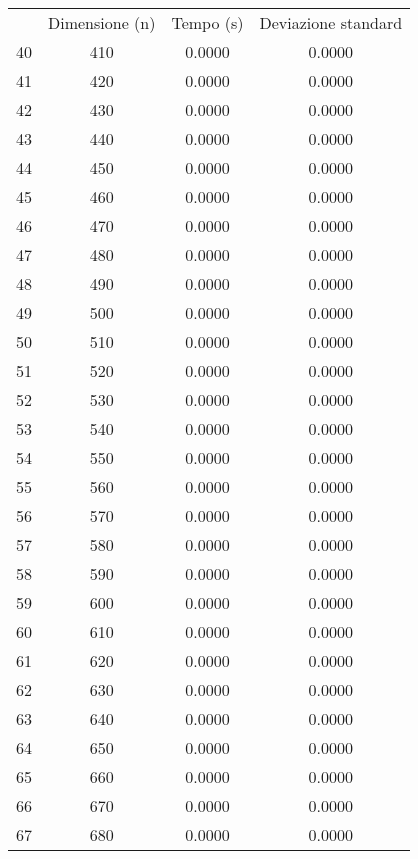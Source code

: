 \begin{table}
\centering
\begin{adjustbox}{width=1\textwidth/2}
\begin{tabular}{|c|c|c|c|}
\hline
 & Dimensione (n) & Tempo (s) & Deviazione standard \\
40 & 410 & 0.0000 & 0.0000 \\
\cline{1-4}
41 & 420 & 0.0000 & 0.0000 \\
\cline{1-4}
42 & 430 & 0.0000 & 0.0000 \\
\cline{1-4}
43 & 440 & 0.0000 & 0.0000 \\
\cline{1-4}
44 & 450 & 0.0000 & 0.0000 \\
\cline{1-4}
45 & 460 & 0.0000 & 0.0000 \\
\cline{1-4}
46 & 470 & 0.0000 & 0.0000 \\
\cline{1-4}
47 & 480 & 0.0000 & 0.0000 \\
\cline{1-4}
48 & 490 & 0.0000 & 0.0000 \\
\cline{1-4}
49 & 500 & 0.0000 & 0.0000 \\
\cline{1-4}
50 & 510 & 0.0000 & 0.0000 \\
\cline{1-4}
51 & 520 & 0.0000 & 0.0000 \\
\cline{1-4}
52 & 530 & 0.0000 & 0.0000 \\
\cline{1-4}
53 & 540 & 0.0000 & 0.0000 \\
\cline{1-4}
54 & 550 & 0.0000 & 0.0000 \\
\cline{1-4}
55 & 560 & 0.0000 & 0.0000 \\
\cline{1-4}
56 & 570 & 0.0000 & 0.0000 \\
\cline{1-4}
57 & 580 & 0.0000 & 0.0000 \\
\cline{1-4}
58 & 590 & 0.0000 & 0.0000 \\
\cline{1-4}
59 & 600 & 0.0000 & 0.0000 \\
\cline{1-4}
60 & 610 & 0.0000 & 0.0000 \\
\cline{1-4}
61 & 620 & 0.0000 & 0.0000 \\
\cline{1-4}
62 & 630 & 0.0000 & 0.0000 \\
\cline{1-4}
63 & 640 & 0.0000 & 0.0000 \\
\cline{1-4}
64 & 650 & 0.0000 & 0.0000 \\
\cline{1-4}
65 & 660 & 0.0000 & 0.0000 \\
\cline{1-4}
66 & 670 & 0.0000 & 0.0000 \\
\cline{1-4}
67 & 680 & 0.0000 & 0.0000 \\
\cline{1-4}

\end{tabular}
\end{adjustbox}
\end{table}
